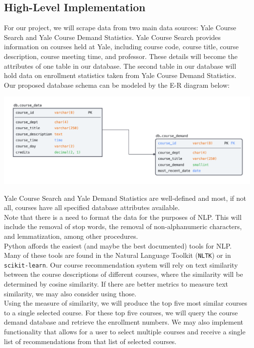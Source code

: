\documentclass{article}
\begin{document}
\subsection*{High-Level Implementation}
For our project, we will scrape data from two main data sources: Yale Course Search and Yale Course Demand Statistics. Yale Course Search provides information on courses held at Yale, including course code, course title, course description, course meeting time, and professor. These details will become the attributes of one table in our database. The second table in our database will hold data on enrollment statistics taken from Yale Course Demand Statistics. \\[2mm]
Our proposed database schema can be modeled by the E-R diagram below: 
\begin{center}
    \includegraphics[scale=0.30]{db_schema.png}
\end{center}
Yale Course Search and Yale Demand Statistics are well-defined and most, if not all, courses have all specified database attributes available. \\[2mm]
Note that there is a need to format the data for the purposes of NLP. This will include the removal of stop words, the removal of non-alphanumeric characters, and lemmatization, among other procedures. \\[2mm]
Python affords the easiest (and maybe the best documented) tools for NLP. Many of these tools are found in the Natural Language Toolkit (\texttt{NLTK}) or in \texttt{scikit-learn}. Our course recommendation system will rely on text similarity between the course descriptions of different courses, where the similarity will be determined by cosine similarity. If there are better metrics to measure text similarity, we may also consider using those. \\[2mm]
Using the measure of similarity, we will produce the top five most similar courses to a single selected course. For these top five courses, we will query the course demand database and retrieve the enrollment numbers. We may also implement functionality that allows for a user to select multiple courses and receive a single list of recommendations from that list of selected courses.
 
\end{document}
